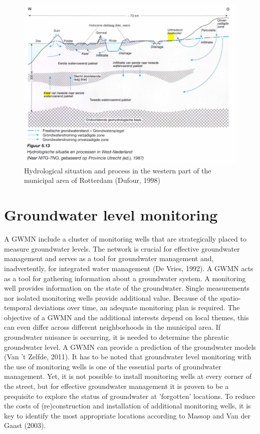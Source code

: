 \begin{figure}[h]
    \centering
    \includegraphics[width=0.95\linewidth]{figures/figures theory/dufour1998.png}
    \caption{Hydrological situation and process in the western part of the municipal area of Rotterdam (Dufour, 1998)}
\end{figure}

\section{Groundwater level monitoring}
A GWMN include a cluster of monitoring wells that are strategically placed to measure groundwater levels. The network is crucial for effective groundwater management and serves as a tool for groundwater management and, inadvertently, for integrated water management (De Vries, 1992). A GWMN acts as a tool for gathering information about a groundwater system. A monitoring well provides information on the state of the groundwater. Single measurements nor isolated monitoring wells provide additional value. Because of the spatio-temporal deviations over time, an adequate monitoring plan is required. The objective of a GWMN and the additional interests depend on local themes, this can even differ across different neighborhoods in the municipal area. If groundwater nuisance is occurring, it is needed to determine the phreatic groundwater level. A GWMN can provide a prediction of the groundwater models (Van 't Zelfde, 2011). It has to be noted that groundwater level monitoring with the use of monitoring wells is one of the essential parts of groundwater management. Yet, it is not possible to install monitoring wells at every corner of the street, but for effective groundwater management it is proven to be a prequisite to explore the status of groundwater at 'forgotten' locations. To reduce the costs of (re)construction and installation of additional monitoring wells, it is key to identify the most appropriate locations according to Massop and Van der Gaast (2003). 

